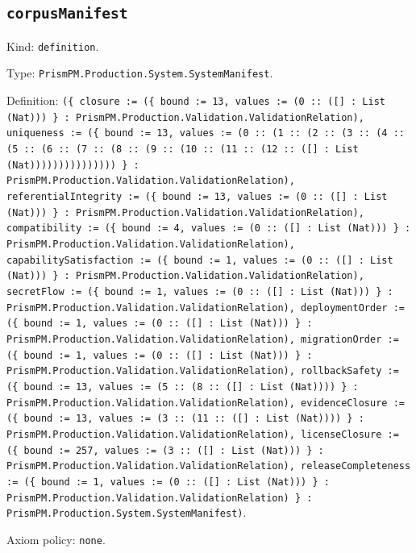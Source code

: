 \documentclass[11pt]{article}
\begin{document}
\subsection*{\texttt{corpusManifest}}
\noindent Kind: \texttt{definition}.\par
\noindent Type: \texttt{PrismPM.Production.System.SystemManifest}.\par
\noindent Definition: \texttt{(\{ closure := (\{ bound := 13, values := (0 :: ([] : List (Nat))) \} : PrismPM.Production.Validation.ValidationRelation), uniqueness := (\{ bound := 13, values := (0 :: (1 :: (2 :: (3 :: (4 :: (5 :: (6 :: (7 :: (8 :: (9 :: (10 :: (11 :: (12 :: ([] : List (Nat))))))))))))))) \} : PrismPM.Production.Validation.ValidationRelation), referentialIntegrity := (\{ bound := 13, values := (0 :: ([] : List (Nat))) \} : PrismPM.Production.Validation.ValidationRelation), compatibility := (\{ bound := 4, values := (0 :: ([] : List (Nat))) \} : PrismPM.Production.Validation.ValidationRelation), capabilitySatisfaction := (\{ bound := 1, values := (0 :: ([] : List (Nat))) \} : PrismPM.Production.Validation.ValidationRelation), secretFlow := (\{ bound := 1, values := (0 :: ([] : List (Nat))) \} : PrismPM.Production.Validation.ValidationRelation), deploymentOrder := (\{ bound := 1, values := (0 :: ([] : List (Nat))) \} : PrismPM.Production.Validation.ValidationRelation), migrationOrder := (\{ bound := 1, values := (0 :: ([] : List (Nat))) \} : PrismPM.Production.Validation.ValidationRelation), rollbackSafety := (\{ bound := 13, values := (5 :: (8 :: ([] : List (Nat)))) \} : PrismPM.Production.Validation.ValidationRelation), evidenceClosure := (\{ bound := 13, values := (3 :: (11 :: ([] : List (Nat)))) \} : PrismPM.Production.Validation.ValidationRelation), licenseClosure := (\{ bound := 257, values := (3 :: ([] : List (Nat))) \} : PrismPM.Production.Validation.ValidationRelation), releaseCompleteness := (\{ bound := 1, values := (0 :: ([] : List (Nat))) \} : PrismPM.Production.Validation.ValidationRelation) \} : PrismPM.Production.System.SystemManifest)}.\par
\noindent Axiom policy: \texttt{none}.\par
\end{document}
